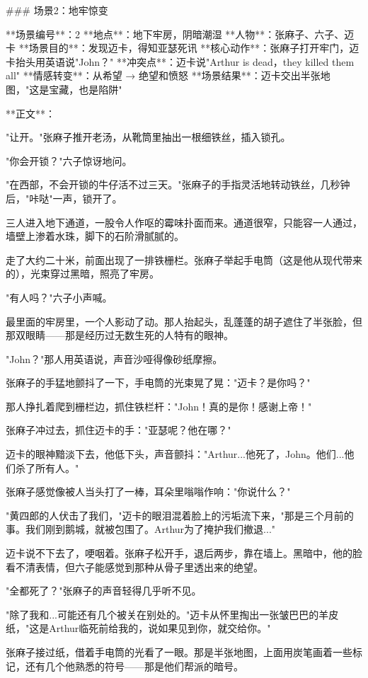 ### 场景2：地牢惊变

**场景编号**：2  
**地点**：地下牢房，阴暗潮湿  
**人物**：张麻子、六子、迈卡  
**场景目的**：发现迈卡，得知亚瑟死讯  
**核心动作**：张麻子打开牢门，迈卡抬头用英语说"John？"  
**冲突点**：迈卡说"Arthur is dead，they killed them all"  
**情感转变**：从希望 → 绝望和愤怒  
**场景结果**：迈卡交出半张地图，"这是宝藏，也是陷阱"

**正文**：

"让开。"张麻子推开老汤，从靴筒里抽出一根细铁丝，插入锁孔。

"你会开锁？"六子惊讶地问。

"在西部，不会开锁的牛仔活不过三天。"张麻子的手指灵活地转动铁丝，几秒钟后，"咔哒"一声，锁开了。

三人进入地下通道，一股令人作呕的霉味扑面而来。通道很窄，只能容一人通过，墙壁上渗着水珠，脚下的石阶滑腻腻的。

走了大约二十米，前面出现了一排铁栅栏。张麻子举起手电筒（这是他从现代带来的），光束穿过黑暗，照亮了牢房。

"有人吗？"六子小声喊。

最里面的牢房里，一个人影动了动。那人抬起头，乱蓬蓬的胡子遮住了半张脸，但那双眼睛——那是经历过无数生死的人特有的眼神。

"John？"那人用英语说，声音沙哑得像砂纸摩擦。

张麻子的手猛地颤抖了一下，手电筒的光束晃了晃："迈卡？是你吗？"

那人挣扎着爬到栅栏边，抓住铁栏杆："John！真的是你！感谢上帝！"

张麻子冲过去，抓住迈卡的手："亚瑟呢？他在哪？"

迈卡的眼神黯淡下去，他低下头，声音颤抖："Arthur...他死了，John。他们...他们杀了所有人。"

张麻子感觉像被人当头打了一棒，耳朵里嗡嗡作响："你说什么？"

"黄四郎的人伏击了我们，"迈卡的眼泪混着脸上的污垢流下来，"那是三个月前的事。我们刚到鹅城，就被包围了。Arthur为了掩护我们撤退..."

迈卡说不下去了，哽咽着。张麻子松开手，退后两步，靠在墙上。黑暗中，他的脸看不清表情，但六子能感觉到那种从骨子里透出来的绝望。

"全都死了？"张麻子的声音轻得几乎听不见。

"除了我和...可能还有几个被关在别处的。"迈卡从怀里掏出一张皱巴巴的羊皮纸，"这是Arthur临死前给我的，说如果见到你，就交给你。"

张麻子接过纸，借着手电筒的光看了一眼。那是半张地图，上面用炭笔画着一些标记，还有几个他熟悉的符号——那是他们帮派的暗号。

